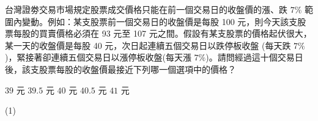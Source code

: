 \begin{QUESTIONS}
\begin{QUESTION}
\begin{QBODY}
            台灣證劵交易市場規定股票成交價格只能在前一個交易日的收盤價的漲、跌 $7\%$ 範圍內變動。例如：某支股票前一個交易日的收盤價是每股 100 元，則今天該支股票每股的買賣價格必須在 93 元至 107 元之間。假設有某支股票的價格起伏很大，某一天的收盤價是每股 40 元，次日起連續五個交易日以跌停板收盤 (每天跌 $7\%$)，緊接著卻連續五個交易日以漲停板收盤(每天漲 $7\%$)。請問經過這十個交易日後，該支股票每股的收盤價最接近下列哪一個選項中的價格？
            \begin{QOPS}
                \QOP $39$ 元
                \QOP $39.5$ 元
                \QOP $40$ 元
                \QOP $40.5$ 元
                \QOP $41$ 元
            \end{QOPS}
        \end{QBODY}
        \begin{QFROMS}
        \end{QFROMS}
        \begin{QTAGS}\end{QTAGS}
        \begin{QANS}
            (1)
        \end{QANS}
        \begin{QSOLLIST}
        \end{QSOLLIST}
        \begin{QEMPTYSPACE}
        \end{QEMPTYSPACE}
    \end{QUESTION}
\end{QUESTIONS}
